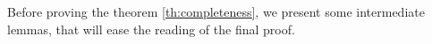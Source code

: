 \documentclass[a4paper,twoside,12pt]{report}
\newcommand{\rrule}[2]{\lstinline!#1!  \to \lstinline!#2!}
\begin{document}
Before proving the theorem \ref{th:completeness}, we present some intermediate lemmas, that will ease the reading of the final proof.




%
%
%
%
%
%
%
%
%
%
%
%
%
%
%
%
%
\end{document}
